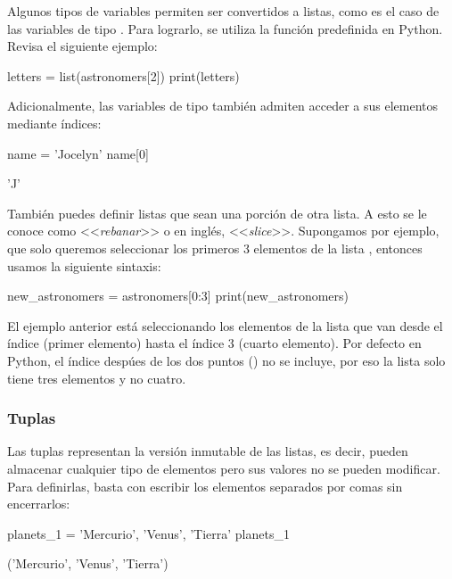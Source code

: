 Algunos tipos de variables permiten ser convertidos a listas, como es el caso de las variables de tipo . Para lograrlo, se utiliza la función  predefinida en Python. Revisa el siguiente ejemplo:

\begin{pyin}
letters = list(astronomers[2])
print(letters)
\end{pyin}
\begin{pyprint}
['J', 'o', 'c', 'e', 'l', 'y', 'n', ' ', 'B', 'e', 'l', 'l']
\end{pyprint}

Adicionalmente, las variables de tipo  también admiten acceder a sus elementos mediante índices:

\begin{pyin}
name = 'Jocelyn'
name[0]
\end{pyin}
\begin{pyout}
'J'
\end{pyout}

También puedes definir listas que sean una porción de otra lista. A esto se le conoce como <<\emph{rebanar}>> o en inglés, <<\emph{slice}>>. Supongamos por ejemplo, que solo queremos seleccionar los primeros 3 elementos de la lista , entonces usamos la siguiente sintaxis:

\begin{pyin}
new_astronomers = astronomers[0:3]
print(new_astronomers)
\end{pyin}
\begin{pyprint}
\end{pyprint}

El ejemplo anterior está seleccionando los elementos de la lista que van desde el índice  (primer elemento) hasta el índice {3} (cuarto elemento). Por defecto en Python, el índice despúes de los dos puntos (\pynorm{:}) no se incluye, por eso la lista  solo tiene tres elementos y no cuatro.

\subsubsection{Tuplas}
Las tuplas representan la versión inmutable de las listas, es decir, pueden almacenar cualquier tipo de elementos pero sus valores no se pueden modificar. Para definirlas, basta con escribir los elementos separados por comas sin encerrarlos:

\begin{pyin}
planets_1 = 'Mercurio', 'Venus', 'Tierra'
planets_1
\end{pyin}
\begin{pyout}
('Mercurio', 'Venus', 'Tierra')
\end{pyout}

